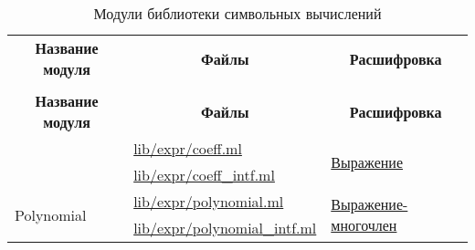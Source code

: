 \begin{centering}
    \begin{longtable}{|l|l|l|}
        \caption{Модули библиотеки символьных вычислений} \label{exprtable}                                                                                                                                                                       \\

        \hline \multicolumn{1}{|c|}{\textbf{Название модуля}} & \multicolumn{1}{c|}{\textbf{Файлы}}                                                                              & \multicolumn{1}{c|}{\textbf{Расшифровка}}                      \\ \hhline{|=|=|=|}
        \endfirsthead

        \multicolumn{3}{c}%
        {\hspace{-12.5cm}{Окончание таблицы \thetable} \vspace{1ex}}                                                                                                                                                                              \\
        \hline \multicolumn{1}{|c|}{\textbf{Название модуля}} & \multicolumn{1}{c|}{\textbf{Файлы}}                                                                              & \multicolumn{1}{c|}{\textbf{Расшифровка}}                      \\ \hhline{|=|=|=|}
        \endhead

        \multirow{2}{*}{Coeff}                                & \href{https://github.com/prekel/chapgame/blob/master/lib/expr/coeff.ml}{lib/expr/coeff.ml}                       & \multirow{2}{*}{\hyperref[exprdescr]{Выражение}}               \\*
                                                              & \href{https://github.com/prekel/chapgame/blob/master/lib/expr/coeff\_intf.ml}{lib/expr/coeff\_intf.ml}           &                                                                \\ \hline
        \multirow{2}{*}{Polynomial}                           & \href{https://github.com/prekel/chapgame/blob/master/lib/expr/polynomial.ml}{lib/expr/polynomial.ml}             & \multirow{2}{*}{\hyperref[exprpolydescr]{Выражение-многочлен}} \\*
                                                              & \href{https://github.com/prekel/chapgame/blob/master/lib/expr/polynomial\_intf.ml}{lib/expr/polynomial\_intf.ml} &                                                                \\ \hline
    \end{longtable}
\end{centering}

